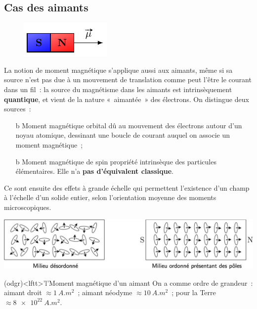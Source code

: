 \documentclass[../../main/main.tex]{subfiles}
\begin{document}
\subsection{Cas des aimants}
\label{ssec:magaim}
\begin{figure}
	\vspace*{-35pt}
	\begin{center}
		\includegraphics[scale=1]{momag_aimdroit}
	\end{center}
\end{figure}
La notion de moment magnétique s'applique aussi aux aimants, même si sa source
n'est pas due à un mouvement de translation comme peut l'être le courant dans un
fil~: la source du magnétisme dans les aimants est intrinsèquement
\textbf{quantique}, et vient de la nature «~aimantée~» des électrons. On
distingue deux sources~:
\begin{itemize}
	\item[b]{Moment magnétique orbital} dû au mouvement des électrons autour d'un
	noyau atomique, dessinant une boucle de courant auquel on associe un moment
	magnétique~;
	\item[b]{Moment magnétique de spin} propriété intrinsèque des particules
	élémentaires. Elle n'a \textbf{pas d'équivalent classique}.
\end{itemize}
Ce sont ensuite des effets à grande échelle qui permettent l'existence d'un
champ à l'échelle d'un solide entier, selon l'orientation moyenne des moments
microscopiques.

\begin{center}
	\includegraphics[scale=.8]{momag_aimdroit-qtq}
\end{center}

\begin{tcb*}(odgr)<lftt>'l'{Moment magnétique d'un aimant}
	On a comme ordre de grandeur~: aimant droit $\approx \SI{1}{A.m^2}$~; aimant
	néodyme $\approx \SI{10}{A.m^2}$~; pour la Terre $\approx \SI{8e22}{A.m^2}$.
\end{tcb*}
\vspace{-15pt}
\end{document}
